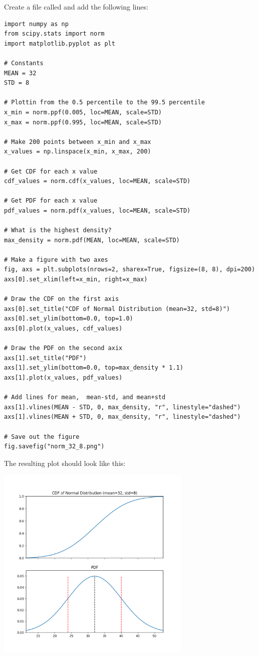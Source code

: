 Create a file called  and add the following lines:

\begin{verbatim}
import numpy as np
from scipy.stats import norm
import matplotlib.pyplot as plt

# Constants
MEAN = 32
STD = 8

# Plottin from the 0.5 percentile to the 99.5 percentile
x_min = norm.ppf(0.005, loc=MEAN, scale=STD)
x_max = norm.ppf(0.995, loc=MEAN, scale=STD)

# Make 200 points between x_min and x_max
x_values = np.linspace(x_min, x_max, 200)

# Get CDF for each x value
cdf_values = norm.cdf(x_values, loc=MEAN, scale=STD)

# Get PDF for each x value
pdf_values = norm.pdf(x_values, loc=MEAN, scale=STD)

# What is the highest density?
max_density = norm.pdf(MEAN, loc=MEAN, scale=STD)

# Make a figure with two axes
fig, axs = plt.subplots(nrows=2, sharex=True, figsize=(8, 8), dpi=200)
axs[0].set_xlim(left=x_min, right=x_max)

# Draw the CDF on the first axis
axs[0].set_title("CDF of Normal Distribution (mean=32, std=8)")
axs[0].set_ylim(bottom=0.0, top=1.0)
axs[0].plot(x_values, cdf_values)

# Draw the PDF on the second axix
axs[1].set_title("PDF")
axs[1].set_ylim(bottom=0.0, top=max_density * 1.1)
axs[1].plot(x_values, pdf_values)

# Add lines for mean,  mean-std, and mean+std
axs[1].vlines(MEAN - STD, 0, max_density, "r", linestyle="dashed")
axs[1].vlines(MEAN + STD, 0, max_density, "r", linestyle="dashed")

# Save out the figure
fig.savefig("norm_32_8.png")
\end{verbatim}

The resulting plot should look like this:

\includegraphics[width=0.7\textwidth]{norm_32_8.png}

